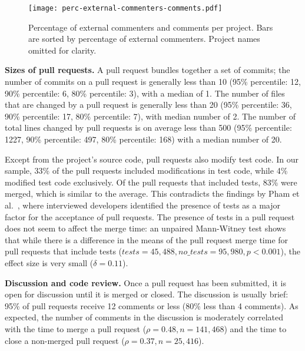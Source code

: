 \documentclass{sig-alternate}
\begin{document}
%
\begin{figure}
\centering
\texttt{[image: perc-external-commenters-comments.pdf]}
\label{fig:pull-num-comments}
\caption{Percentage of external commenters and comments per project. Bars
are sorted by percentage of external commenters. Project names omitted for
clarity.}
\end{figure}

\textbf{Sizes of pull requests.}
A pull request bundles together a set of commits; the number of commits on a
pull request is generally less than 10 (95\% percentile: 12, 90\% percentile: 6,
80\% percentile: 3), with a median of 1. The number of files that are changed by
a pull request is generally less than 20 (95\% percentile: 36, 90\% percentile:
17, 80\% percentile: 7), with median number of 2. The number of total lines
changed by pull requests is on average less than 500 (95\% percentile: 1227,
90\% percentile: 497, 80\% percentile: 168) with a median number of 20.

Except from the project's source code, pull requests also modify test code. In
our sample, 33\% of the pull requests included modifications in test code, while
4\% modified test code exclusively. Of the pull requests that included tests,
83\% were merged, which is similar to the average.  This contradicts the
findings by Pham et al.~\cite{Pham13}, where interviewed developers identified
the presence of tests as a major factor for the acceptance of pull requests.
The presence of tests in a pull request does not seem to affect the merge time:
an unpaired Mann-Witney test shows that while there is a difference in the means
of the pull request merge time for pull requests that include tests ($tests =
45,488, no\_tests = 95,980, p < 0.001$), the effect size is very small ($\delta =
0.11$).


\textbf{Discussion and code review.}
Once a pull request has been submitted, it is open for discussion until it is
merged or closed. The discussion is usually brief: 95\% of pull requests receive
12 comments or less (80\% less than 4 comments). As expected, the number of
comments in the discussion is moderately correlated with the time to merge a
pull request ($\rho = 0.48, n = 141,468$) and the time to close a non-merged
pull request ($\rho = 0.37, n = 25,416$).
\end{document}
